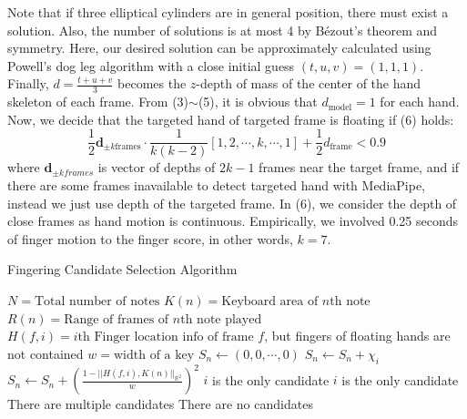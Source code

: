 \documentclass{article}
\begin{document}
Note that if three elliptical cylinders are in general position, there must exist a solution. Also, the number of solutions is at most 4 by B\'{e}zout's theorem and symmetry. Here, our desired solution can be approximately calculated using Powell's dog leg algorithm with a close initial guess $(t,u,v)=(1,1,1)$.
Finally, $d=\displaystyle\frac{t+u+v}{3}$ becomes the $z$-depth of mass of the center of the hand skeleton of each frame. From (3)$\sim$(5), it is obvious that $d_{\text{model}}=1$ for each hand.\\
Now, we decide that the targeted hand of targeted frame is floating if (6) holds: 
\begin{equation}
    \frac{1}{2}\mathbf{d}_{\pm k\text{frames}} \cdot \frac{1}{k(k-2)}[1,2,\cdots, k,\cdots, 1]+\frac{1}{2}d_{\text{frame}}<0.9
\end{equation} where $\mathbf{d}_{\pm kframes}$ is vector of depths of $2k-1$ frames near the target frame, and if there are some frames inavailable to detect targeted hand with MediaPipe, instead we just use depth of the targeted frame. In (6), we consider the depth of close frames as hand motion is continuous. Empirically, we involved 0.25 seconds of finger motion to the finger score, in other words, $k=7$.\\
\begin{algorithm}[h]
\caption{Fingering Candidate Selection Algorithm}\label{alg:cap}
\begin{algorithmic}
\State $N = \text{Total number of notes}$
\State $K(n) = \text{Keyboard area of $n$th note}$
\State $R(n) = \text{Range of frames of $n$th note played}$
\State $H(f,i) = i\text{th Finger location info of frame $f$,} $ but fingers of floating hands are not contained
\State $w = \text{width of a key}$ 
\State $S_n \gets (0,0,\cdots, 0)$ 
\State $S_n\gets S_n + \chi_i$ 
\State $S_n \gets S_n + \left(\frac{1-||H(f,i),K(n)||_{\mathbb{R}^2}}{w}\right)^{2}$
\EndIf
\EndFor
\EndFor
\EndFor
{}
\State $i$ is the only candidate
\State $i$ is the only candidate
\Else \text{ }  There are multiple candidates
\EndIf
\Else \text{ } There are no candidates
\EndIf
\EndFor
\end{algorithmic}
\end{algorithm}
\end{document}
